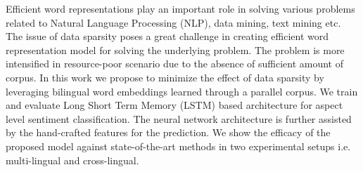 Efficient word representations play an important role in solving various problems related to Natural Language Processing (NLP), data mining, text mining etc. The issue of data sparsity poses a great challenge in creating efficient word representation model for solving the underlying problem. The problem is more intensified in resource-poor scenario due to the absence of sufficient amount of corpus. In this work we propose to minimize the effect of data sparsity by leveraging bilingual word embeddings learned through a parallel corpus. We train and evaluate Long Short Term Memory (LSTM) based architecture for aspect level sentiment classification. The neural network architecture is further assisted by the hand-crafted features for the prediction. We show the efficacy of the proposed model against state-of-the-art methods in two experimental setups i.e. multi-lingual and cross-lingual.
